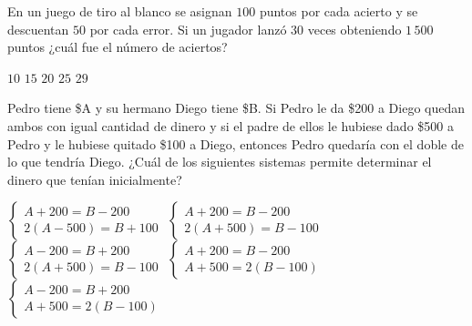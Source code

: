\documentclass[sin nombre]{srs}
\begin{document}
\begin{preguntas}[after-item-skip=2cm]
\pregunta En un juego de tiro al blanco se asignan $100$ puntos por cada acierto y se descuentan $50$ por cada error. Si un jugador lanzó $30$ veces obteniendo $1\,500$ puntos ¿cuál fue el número de aciertos?
\begin{vertical}
\alternativa $10$
\alternativa $15$
\alternativa $20$
\alternativa $25$
\alternativa $29$
\end{vertical}

\pregunta Pedro tiene \$A y su hermano Diego tiene \$B. Si Pedro le da \$200 a Diego quedan ambos con igual cantidad de dinero y si el padre de ellos le hubiese dado \$500 a Pedro y le hubiese quitado \$100 a Diego, entonces Pedro quedaría con el doble de lo que tendría Diego. ¿Cuál de los siguientes sistemas permite determinar el dinero que tenían inicialmente?
\begin{vertical}
\alternativa $\begin{cases} A + 200 = B - 200 \\ 2\left(A - 500\right) = B + 100 \end{cases}$
\alternativa $\begin{cases} A + 200 = B - 200 \\ 2\left(A + 500\right) = B - 100 \end{cases}$
\alternativa $\begin{cases} A - 200 = B + 200 \\ 2\left(A + 500\right) = B - 100 \end{cases}$
\alternativa $\begin{cases} A + 200 = B - 200 \\ A + 500 = 2\left(B - 100\right) \end{cases}$
\alternativa $\begin{cases} A - 200 = B + 200 \\ A + 500 = 2\left(B - 100\right) \end{cases}$
\end{vertical}


\end{preguntas}
\end{document}

